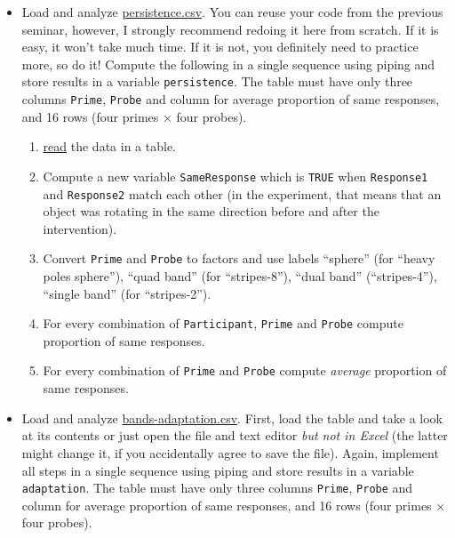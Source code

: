 \documentclass[
]{book}
\providecommand{\tightlist}{%
  \setlength{\itemsep}{0pt}\setlength{\parskip}{0pt}}
\begin{document}
\begin{itemize}
\tightlist
\item
  Load and analyze \href{data/persistence.csv}{persistence.csv}. You can reuse your code from the previous seminar, however, I strongly recommend redoing it here from scratch. If it is easy, it won't take much time. If it is not, you definitely need to practice more, so do it! Compute the following in a single sequence using piping and store results in a variable \texttt{persistence}. The table must have only three columns \texttt{Prime}, \texttt{Probe} and column for average proportion of same responses, and 16 rows (four primes × four probes).

  \begin{enumerate}
  \def\labelenumi{\arabic{enumi}.}
  \tightlist
  \item
    \protect\hyperlink{readr}{read} the data in a table.
  \item
    Compute a new variable \texttt{SameResponse} which is \texttt{TRUE} when \texttt{Response1} and \texttt{Response2} match each other (in the experiment, that means that an object was rotating in the same direction before and after the intervention).
  \item
    Convert \texttt{Prime} and \texttt{Probe} to factors and use labels ``sphere'' (for ``heavy poles sphere''), ``quad band'' (for ``stripes-8''), ``dual band'' (``stripes-4''), ``single band'' (for ``stripes-2'').
  \item
    For every combination of \texttt{Participant}, \texttt{Prime} and \texttt{Probe} compute proportion of same responses.
  \item
    For every combination of \texttt{Prime} and \texttt{Probe} compute \emph{average} proportion of same responses.
  \end{enumerate}
\item
  Load and analyze \href{data/bands-adaptation.csv}{bands-adaptation.csv}. First, load the table and take a look at its contents or just open the file and text editor \emph{but not in Excel} (the latter might change it, if you accidentally agree to save the file). Again, implement all steps in a single sequence using piping and store results in a variable \texttt{adaptation}. The table must have only three columns \texttt{Prime}, \texttt{Probe} and column for average proportion of same responses, and 16 rows (four primes × four probes).


\end{itemize}
\end{document}
